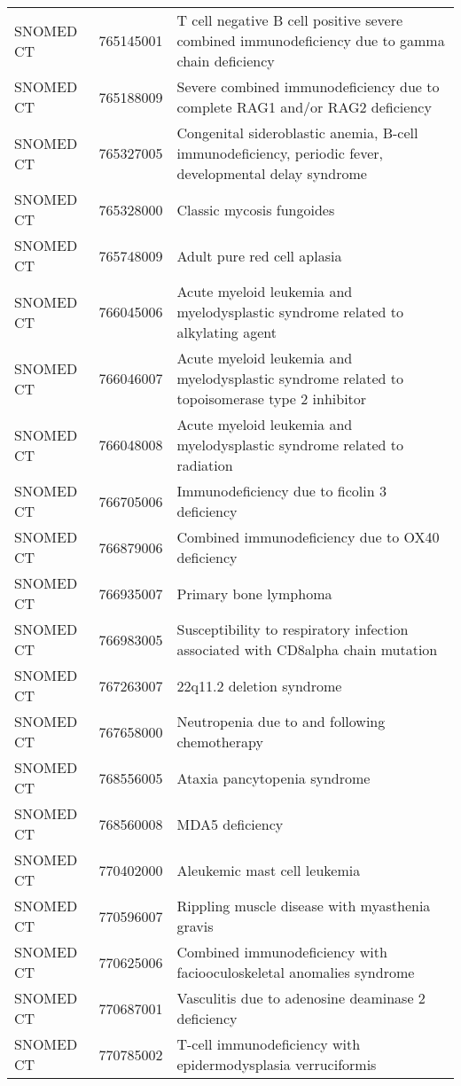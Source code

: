 \begin{table}[ht]
\begin{tabular}{lll}
  SNOMED CT & 765145001 & T cell negative B cell positive severe combined immunodeficiency due to gamma chain deficiency \\ 
  SNOMED CT & 765188009 & Severe combined immunodeficiency due to complete RAG1 and/or RAG2 deficiency \\ 
  SNOMED CT & 765327005 & Congenital sideroblastic anemia, B-cell immunodeficiency, periodic fever, developmental delay syndrome \\ 
  SNOMED CT & 765328000 & Classic mycosis fungoides \\ 
  SNOMED CT & 765748009 & Adult pure red cell aplasia \\ 
  SNOMED CT & 766045006 & Acute myeloid leukemia and myelodysplastic syndrome related to alkylating agent \\ 
  SNOMED CT & 766046007 & Acute myeloid leukemia and myelodysplastic syndrome related to topoisomerase type 2 inhibitor \\ 
  SNOMED CT & 766048008 & Acute myeloid leukemia and myelodysplastic syndrome related to radiation \\ 
  SNOMED CT & 766705006 & Immunodeficiency due to ficolin 3 deficiency \\ 
  SNOMED CT & 766879006 & Combined immunodeficiency due to OX40 deficiency \\ 
  SNOMED CT & 766935007 & Primary bone lymphoma \\ 
  SNOMED CT & 766983005 & Susceptibility to respiratory infection associated with CD8alpha chain mutation \\ 
  SNOMED CT & 767263007 & 22q11.2 deletion syndrome \\ 
  SNOMED CT & 767658000 & Neutropenia due to and following chemotherapy \\ 
  SNOMED CT & 768556005 & Ataxia pancytopenia syndrome \\ 
  SNOMED CT & 768560008 & MDA5 deficiency \\ 
  SNOMED CT & 770402000 & Aleukemic mast cell leukemia \\ 
  SNOMED CT & 770596007 & Rippling muscle disease with myasthenia gravis \\ 
  SNOMED CT & 770625006 & Combined immunodeficiency with faciooculoskeletal anomalies syndrome \\ 
  SNOMED CT & 770687001 & Vasculitis due to adenosine deaminase 2 deficiency \\ 
  SNOMED CT & 770785002 & T-cell immunodeficiency with epidermodysplasia verruciformis \\ 

\end{tabular}
\end{table}
